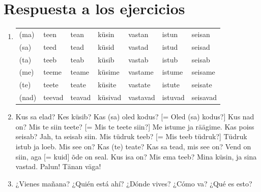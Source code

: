 \Large{\section*{Respuesta a los ejercicios}}

\begin{enumerate}
\item
\begin{tabular}{ l l l l l l l }
(ma)	& teen		& tean		& küsin		& vastan	& istun		& seisan \\
(sa)	& teed		& tead		& küsid		& vastad	& istud		& seisad \\
(ta)	& teeb		& teab		& küsib		& vastab	& istub		& seisab \\
(me)	& teeme		& teame		& küsime	& vastame	& istume	& seisame \\
(te)	& teete		& teate		& küsite	& vastate	& istute	& seisate \\
(nad)	& teevad	& teavad	& küsivad	& vastavad	& istuvad	& seisavad
\end{tabular}
\item Kus sa elad? Kes küsib? Kas (sa) oled kodus? [= Oled (sa) kodus?] Kus nad on? Mis te siin teete? [= Mis te teete siin?] Me istume ja räägime. Kas poiss seisab? Jah, ta seisab siin. Mis tüdruk teeb? [= Mis teeb tüdruk?] Tüdruk istub ja loeb. Mis see on? Kas (te) teate? Kas sa tead, mis see on? Vend on siin, aga [= kuid] õde on seal. Kus isa on? Mis ema teeb? Mina küsin, ja sina vastad. Palun! Tänan väga!
\item ¿Vienes mañana? ¿Quién está ahí? ¿Dónde vives? ¿Cómo va? ¿Qué es esto?
\end{enumerate}
